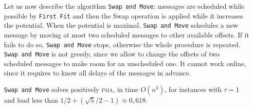 \documentclass[a4paper,UKenglish,cleveref, autoref, thm-restate]{lipics-v2019}
\newcommand\pma{\textsc{pma}\xspace}
\newcommand\firstfit{\texttt{First Fit}\xspace}
\newcommand\swapandmove{\texttt{Swap and Move}\xspace}
\begin{document}
Let us now describe the algorithm \swapandmove:  messages are scheduled while possible by \firstfit and then the Swap operation is applied while it increases the potential. When the potential is maximal, \swapandmove schedules a new message by moving at most two scheduled messages to other available offsets. If it fails to do so, \swapandmove stops, otherwise the whole procedure is repeated. 
\swapandmove  is not greedy, since we allow to change the offsets of two scheduled messages to make room for an unscheduled one. It cannot work online, since it requires to know all delays of the messages in advance. 

\begin{theorem}
\swapandmove solves positively \pma, in time $O(n^3)$, for instances with $\tau =1$ and load less than $1/2 + (\sqrt{5}/2 -1) \approx 0,618$.
\end{theorem}
\end{document}
